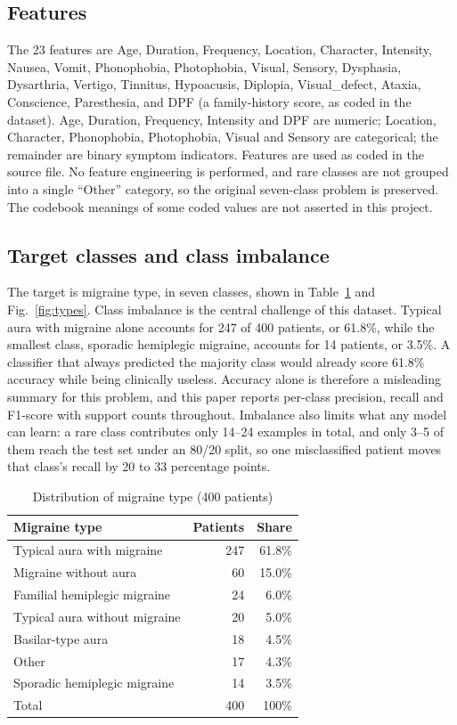 \documentclass[conference]{IEEEtran}
\begin{document}
\subsection{Features}
The 23 features are Age, Duration, Frequency, Location, Character, Intensity, Nausea, Vomit, Phonophobia, Photophobia, Visual, Sensory, Dysphasia, Dysarthria, Vertigo, Tinnitus, Hypoacusis, Diplopia, Visual\_defect, Ataxia, Conscience, Paresthesia, and DPF (a family-history score, as coded in the dataset). Age, Duration, Frequency, Intensity and DPF are numeric; Location, Character, Phonophobia, Photophobia, Visual and Sensory are categorical; the remainder are binary symptom indicators. Features are used as coded in the source file. No feature engineering is performed, and rare classes are not grouped into a single ``Other'' category, so the original seven-class problem is preserved. The codebook meanings of some coded values are not asserted in this project.

\subsection{Target classes and class imbalance}
The target is migraine type, in seven classes, shown in Table~\ref{tab:types} and Fig.~\ref{fig:types}. Class imbalance is the central challenge of this dataset. Typical aura with migraine alone accounts for 247 of 400 patients, or 61.8\%, while the smallest class, sporadic hemiplegic migraine, accounts for 14 patients, or 3.5\%. A classifier that always predicted the majority class would already score 61.8\% accuracy while being clinically useless. Accuracy alone is therefore a misleading summary for this problem, and this paper reports per-class precision, recall and F1-score with support counts throughout. Imbalance also limits what any model can learn: a rare class contributes only 14--24 examples in total, and only 3--5 of them reach the test set under an 80/20 split, so one misclassified patient moves that class's recall by 20 to 33 percentage points.

\begin{table}[t]
\centering
\caption{Distribution of migraine type (400 patients)}
\label{tab:types}
\begin{tabular}{lrr}
\toprule
Migraine type & Patients & Share \\
\midrule
Typical aura with migraine & 247 & 61.8\% \\
Migraine without aura & 60 & 15.0\% \\
Familial hemiplegic migraine & 24 & 6.0\% \\
Typical aura without migraine & 20 & 5.0\% \\
Basilar-type aura & 18 & 4.5\% \\
Other & 17 & 4.3\% \\
Sporadic hemiplegic migraine & 14 & 3.5\% \\
\midrule
Total & 400 & 100\% \\
\bottomrule
\end{tabular}
\end{table}
\end{document}
